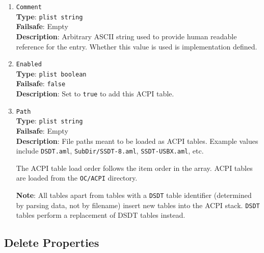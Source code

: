 \documentclass[]{article}
\makeatletter
\renewcommand{\label}[1]{%
\zref@wrapper@immediate{\oldlabel{#1}}}  %
\makeatother
\begin{document}
\begin{enumerate}
\item
  \texttt{Comment}\\
  \textbf{Type}: \texttt{plist\ string}\\
  \textbf{Failsafe}: Empty\\
  \textbf{Description}: Arbitrary ASCII string used to provide human readable
  reference for the entry. Whether this value is used is implementation defined.

\item
  \texttt{Enabled}\\
  \textbf{Type}: \texttt{plist\ boolean}\\
  \textbf{Failsafe}: \texttt{false}\\
  \textbf{Description}: Set to \texttt{true} to add this ACPI table.

\item
  \texttt{Path}\\
  \textbf{Type}: \texttt{plist\ string}\\
  \textbf{Failsafe}: Empty\\
  \textbf{Description}: File paths meant to be loaded as ACPI tables.
  Example values include \texttt{DSDT.aml}, \texttt{SubDir/SSDT-8.aml},
  \texttt{SSDT-USBX.aml}, etc.

  The ACPI table load order follows the item order in the array. ACPI tables
  are loaded from the \texttt{OC/ACPI} directory.

  \textbf{Note}: All tables apart from tables with a \texttt{DSDT} table identifier
  (determined by parsing data, not by filename) insert new tables into the ACPI stack.
  \texttt{DSDT} tables perform a replacement of DSDT tables instead.

\end{enumerate}

\subsection{Delete Properties}\label{acpipropsdelete}
\end{document}
